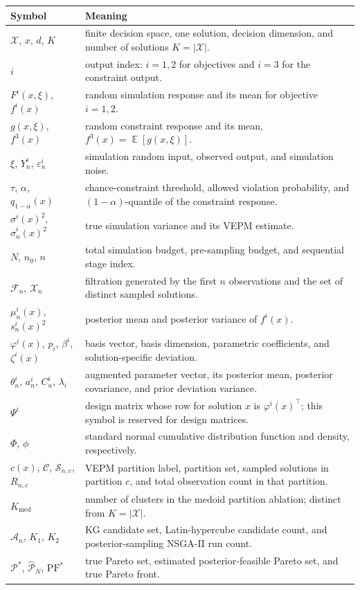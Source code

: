 \documentclass[12pt]{article}
\theoremstyle{plain}
\theoremstyle{definition}
\theoremstyle{remark}
\DeclareMathOperator{\E}{\mathbb{E}}
\newcommand{\cX}{\mathcal{X}}
\newcommand{\cF}{\mathcal{F}}
\newcommand{\cP}{\mathcal{P}}
\begin{document}
\begin{center}
\small
\begin{tabular}{p{}p{}}
\toprule
Symbol & Meaning \\
\midrule
$\cX$, $x$, $d$, $K$ & finite decision space, one solution, decision dimension, and number of solutions $K=|\cX|$. \\
$i$ & output index: $i=1,2$ for objectives and $i=3$ for the constraint output. \\
$F^i(x,\xi)$, $f^i(x)$ & random simulation response and its mean for objective $i=1,2$. \\
$g(x,\xi)$, $f^3(x)$ & random constraint response and its mean, $f^3(x)=\E[g(x,\xi)]$. \\
$\xi$, $Y^i_n$, $\varepsilon^i_n$ & simulation random input, observed output, and simulation noise. \\
$\tau$, $\alpha$, $q_{1-\alpha}(x)$ & chance-constraint threshold, allowed violation probability, and $(1-\alpha)$-quantile of the constraint response. \\
$\sigma^i(x)^2$, $\hat\sigma^i_n(x)^2$ & true simulation variance and its VEPM estimate. \\
$N$, $n_0$, $n$ & total simulation budget, pre-sampling budget, and sequential stage index. \\
$\cF_n$, $\cX_n$ & filtration generated by the first $n$ observations and the set of distinct sampled solutions. \\
$\mu^i_n(x)$, $s^i_n(x)^2$ & posterior mean and posterior variance of $f^i(x)$. \\
$\varphi^i(x)$, $p_i$, $\beta^i$, $\zeta^i(x)$ & basis vector, basis dimension, parametric coefficients, and solution-specific deviation. \\
$\theta^i_n$, $a^i_n$, $C^i_n$, $\lambda_i$ & augmented parameter vector, its posterior mean, posterior covariance, and prior deviation variance. \\
$\Psi^i$ & design matrix whose row for solution $x$ is $\varphi^i(x)^\top$; this symbol is reserved for design matrices. \\
$\Phi$, $\phi$ & standard normal cumulative distribution function and density, respectively. \\
$c(x)$, $\mathcal{C}$, $\mathcal{S}_{n,c}$, $R_{n,c}$ & VEPM partition label, partition set, sampled solutions in partition $c$, and total observation count in that partition. \\
$K_{\mathrm{med}}$ & number of clusters in the medoid partition ablation; distinct from $K=|\cX|$. \\
$\mathcal{A}_n$, $K_1$, $K_2$ & KG candidate set, Latin-hypercube candidate count, and posterior-sampling NSGA-II run count. \\
$\cP^*$, $\hat{\cP}_N$, $\mathrm{PF}^*$ & true Pareto set, estimated posterior-feasible Pareto set, and true Pareto front. \\
\bottomrule
\end{tabular}
\end{center}
\end{document}
